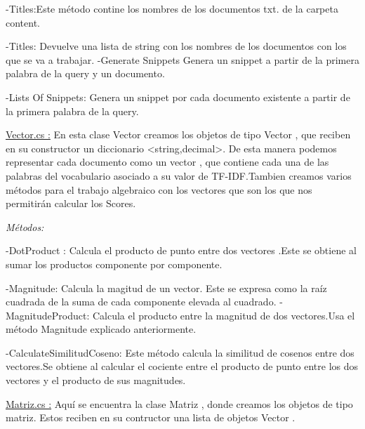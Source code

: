 \documentclass{article}
\begin{document}
\begin{center}
\begin{flushleft}
		-Titles:Este método contine los nombres de los documentos txt. de la carpeta content.\vspace{0.5em} 
		
		-Titles:
		Devuelve una lista de string con los nombres de los documentos con los que se va a trabajar.
		-Generate Snippets
		Genera un snippet a partir de la primera palabra de la query y un documento.\vspace{0.5em}
		
		-Lists Of Snippets:
		Genera un snippet por cada documento existente a partir de la primera palabra de la query.\vspace{0.5em}
		
		\vspace{4em}\underline{Vector.cs :}
		En esta clase Vector creamos los objetos de tipo Vector , que reciben en su constructor un diccionario <string,decimal>. De esta manera podemos representar cada documento como un vector , que contiene cada una de las palabras del vocabulario asociado a su valor de TF-IDF.Tambien creamos varios métodos para el trabajo algebraico con los vectores que son los que nos permitirán calcular los Scores.\vspace{2em}
		
		\textit{ \large {Métodos:}} 
		
		\vspace{1em}-DotProduct :
		Calcula el producto de punto entre dos vectores .Este se obtiene al sumar los productos componente por componente.\vspace{0.5em}
		
		-Magnitude:
		Calcula la magitud de un vector. Este se expresa como la raíz cuadrada de la suma de cada componente elevada al cuadrado.\vspace{0.5em}
		-MagnitudeProduct:
		Calcula el producto entre la magnitud de dos vectores.Usa el método Magnitude explicado anteriormente.\vspace{0.5em}
		
		-CalculateSimilitudCoseno:
		Este método calcula la similitud de cosenos entre dos vectores.Se obtiene al calcular el cociente entre el producto de punto entre los dos vectores y el producto de sus magnitudes.\vspace{4em}
		
		\underline{Matriz.cs :}
		Aquí se encuentra la clase Matriz , donde creamos los objetos de tipo matriz. Estos reciben en su contructor una lista de objetos Vector .\vspace{2em}
		

\end{flushleft}
\end{center}
\end{document}
